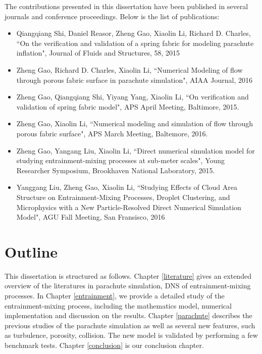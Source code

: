 The contributions presented in this dissertation have been published in several journals 
and conference proceedings. Below is the list of publications:

\begin{itemize}
\item Qiangqiang Shi, Daniel Reasor, Zheng Gao, Xiaolin Li, Richard D. Charles, ``On the verification and validation of a spring fabric for modeling 
parachute inflation", Journal of Fluids and Structures, 58, 2015
\item Zheng Gao, Richard D. Charles, Xiaolin Li, ``Numerical Modeling of flow through porous fabric surface in parachute simulation", AIAA Journal, 2016
\item Zheng Gao, Qiangqiang Shi, Yiyang Yang, Xiaolin Li, ``On verification and validation of spring fabric model", APS April Meeting, Baltimore, 2015.
\item Zheng Gao, Xiaolin Li, ``Numerical modeling and simulation of flow through porous fabric surface", APS March Meeting, 
Baltemore, 2016.
\item Zheng Gao, Yangang Liu, Xiaolin Li, ``Direct numerical simulation model for studying entrainment-mixing processes at 
sub-meter scales", Young Researcher Symposium, Brookhaven National Laboratory, 2015.
\item Yanggang Liu, Zheng Gao, Xiaolin Li, ``Studying Effects of Cloud Area Structure on Entrainment-Mixing Processes, Droplet Clustering, and Microphysics with a New Particle-Resolved Direct Numerical Simulation Model", AGU Fall Meeting, San Fransisco, 2016
\end{itemize}

\section{Outline}
This dissertation is structured as follows. 
Chapter \ref{literature} gives an extended overview of the literatures in 
parachute simulation, DNS of entrainment-mixing processes. 
In Chapter \ref{entrainment}, we provide a detailed study of the entrainment-mixing process, 
including the mathematics model, numerical implementation and discussion on the results.
Chapter \ref{parachute} describes the previous studies of the parachute simulation as well as several new features, such as turbulence, porosity, collision. The new model is validated by performing a few benchmark tests. Chapter \ref{conclusion} is our conclusion chapter.

